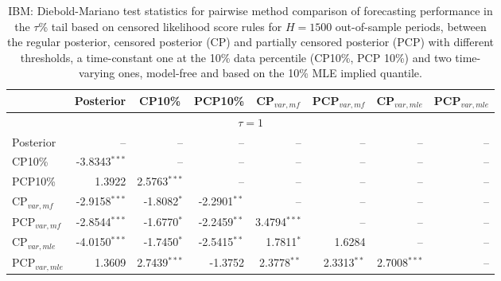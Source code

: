 { \renewcommand{\arraystretch}{1.2} 
 {\footnotesize 
\begin{table} 
\center 
\begin{tabular}{l | rrrrrrr} 
& \multicolumn{1}{c}{Posterior}& \multicolumn{1}{c}{CP10\%}& \multicolumn{1}{c}{PCP10\%}& \multicolumn{1}{c}{CP$_{var,mf}$}& \multicolumn{1}{c}{PCP$_{var,mf}$}& \multicolumn{1}{c}{CP$_{var,mle}$}& \multicolumn{1}{c}{PCP$_{var,mle}$} \\ \hline 
\multicolumn{8}{c}{$\tau = 1$} \\ \hline 
Posterior &    --\phantom{$^{***}$} &    --\phantom{$^{***}$} &    --\phantom{$^{***}$} &    --\phantom{$^{***}$} &    --\phantom{$^{***}$} &    --\phantom{$^{***}$} &    --\phantom{$^{***}$}   \\ 
CP10\% & -3.8343$^{***}$ &    --\phantom{$^{***}$} &    --\phantom{$^{***}$} &    --\phantom{$^{***}$} &    --\phantom{$^{***}$} &    --\phantom{$^{***}$} &    --\phantom{$^{***}$}   \\ 
PCP10\% & 1.3922\phantom{$^{***}$} & 2.5763$^{***}$ &    --\phantom{$^{***}$} &    --\phantom{$^{***}$} &    --\phantom{$^{***}$} &    --\phantom{$^{***}$} &    --\phantom{$^{***}$}   \\ 
CP$_{var,mf}$ & -2.9158$^{***}$ & -1.8082$^{*}$\phantom{$^{**}$} & -2.2901$^{**}$\phantom{$^{*}$} &    --\phantom{$^{***}$} &    --\phantom{$^{***}$} &    --\phantom{$^{***}$} &    --\phantom{$^{***}$}   \\ 
PCP$_{var,mf}$ & -2.8544$^{***}$ & -1.6770$^{*}$\phantom{$^{**}$} & -2.2459$^{**}$\phantom{$^{*}$} & 3.4794$^{***}$ &    --\phantom{$^{***}$} &    --\phantom{$^{***}$} &    --\phantom{$^{***}$}   \\ 
CP$_{var,mle}$ & -4.0150$^{***}$ & -1.7450$^{*}$\phantom{$^{**}$} & -2.5415$^{**}$\phantom{$^{*}$} & 1.7811$^{*}$\phantom{$^{**}$} & 1.6284\phantom{$^{***}$} &    --\phantom{$^{***}$} &    --\phantom{$^{***}$}   \\ 
PCP$_{var,mle}$ & 1.3609\phantom{$^{***}$} & 2.7439$^{***}$ & -1.3752\phantom{$^{***}$} & 2.3778$^{**}$\phantom{$^{*}$} & 2.3313$^{**}$\phantom{$^{*}$} & 2.7008$^{***}$ &    --\phantom{$^{***}$}   \\ 
\hline 
\end{tabular}
 \caption{IBM: Diebold-Mariano test statistics for pairwise method comparison  of forecasting performance in the $\tau$\% tail based on  censored likelihood score rules for $H=1500$ out-of-sample periods,  between  the regular posterior, censored posterior (CP) and  partially censored posterior (PCP) with different thresholds,  a time-constant one at the 10\% data percentile (CP10\%, PCP 10\%) and two time-varying ones, model-free and based on the 10\% MLE implied quantile. }
\label{tab:IBM_DM_1}  
\end{table}
}}